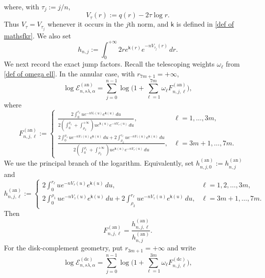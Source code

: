 \documentclass[a4paper]{article}
\numberwithin{equation}{section}
\begin{document}
where, with $\tau_j:=j/n$,
\begin{equation}
\label{def of V tau}
V_{\tau}(r):=q(r)-2\tau\log r.
\end{equation}
Thus $V_\tau=V_{\tau_j}$ whenever it occurs in the $j$th norm, and
$\mathsf{k}$ is defined in \eqref{def of mathsfkr}.  We also set
\begin{equation}
 h_{n,j}:=
\int_{0}^{+\infty}2r e^{\mathsf{k}(r)}e^{-nV_{\tau_j}(r)}\,dr.   
\end{equation}
We next record the exact jump factors.  Recall the telescoping weights
$\omega_\ell$ from \eqref{def of omega ell}.  In the annular case,
with $r_{7m+1}=+\infty$,
\begin{equation}
\label{def of calEnan}
\log\mathcal{E}_{n,s\lambda,\alpha}^{(\mathrm{an})}=
\sum_{j=0}^{n-1}\log\Big( 
1+\sum_{\ell=1}^{7m}\omega_{\ell}F_{n,j,\ell}^{(\mathrm{an})}
\Bigr), 
\end{equation}
where 
\begin{equation}
\label{def of norming constant + counting on annulus}
   F_{n,j,\ell}^{(\mathrm{an})}
   :=
   \begin{cases}
       \frac{2\int_0^{r_{\ell}}ue^{-nV_{\tau}(u)}e^{\mathsf{k}(u)}\,du}{2(\int_{0}^{\rho_1}+\int_{\rho_2}^{+\infty})ue^{\mathsf{k}(u)}e^{-nV_{\tau}(u)}\,du}, & \ell=1,\dots, 3m, \\
       \frac{2\int_0^{\rho_1}ue^{-nV_{\tau}(u)}e^{\mathsf{k}(u)}\,du+2\int_{\rho_2}^{r_{\ell}}ue^{-nV_{\tau}(u)}e^{\mathsf{k}(u)}\,du}{2(\int_{0}^{\rho_1}+\int_{\rho_2}^{+\infty})ue^{\mathsf{k}(u)}e^{-nV_{\tau}(u)}\,du}, & \ell=3m+1,\dots,7m. 
    \end{cases}
\end{equation}
We use the principal branch of the logarithm.  Equivalently, set
$h_{n,j,0}^{(\mathrm{an})}:=h_{n,j}^{(\mathrm{an})}$ and
\begin{equation}
h_{n,j,\ell}^{(\mathrm{an})}
:=
\begin{cases}
2\int_0^{r_{\ell}}u e^{-nV_{\tau}(u)}e^{\mathsf{k}(u)}\,du,     & \ell=1,2,\dots,3m, \\
2\int_0^{\rho_1}u e^{-nV_{\tau}(u)}e^{\mathsf{k}(u)}\,du
+2\int_{\rho_2}^{r_{\ell}}u e^{-nV_{\tau}(u)}e^{\mathsf{k}(u)}\,du,       & \ell=3m+1,\dots, 7m.
\end{cases}
\end{equation}
Then
\[
    F_{n,j,\ell}^{(\mathrm{an})}= \frac{h_{n,j,\ell}^{(\mathrm{an})}}{h_{n,j}^{(\mathrm{an})}}. 
\]
For the disk-complement geometry, put $r_{3m+1}=+\infty$ and write
\begin{equation}
\label{def of calEndc}
\log \mathcal{E}_{n,s\lambda,\alpha}^{(\mathrm{dc})}=
\sum_{j=0}^{n-1}\log\Big( 
1+\sum_{\ell=1}^{3m}\omega_{\ell}F_{n,j,\ell}^{(\mathrm{dc})}
\Bigr), 
\end{equation}
\end{document}
